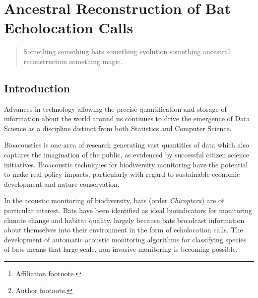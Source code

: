 \documentclass[wsdraft]{ws-rv9x6} %
\begin{document}
\chapter[Ancestral Reconstruction of Bat Echolocation Calls]{Ancestral Reconstruction of Bat Echolocation Calls}\label{ra_ch1}

\author[J.P. Meagher et al.]{J.P. Meagher\footnote{Author footnote.}}

\address{Department of Statistics,\\
University of Warwick, \\
J.Meagher@Warwick.ac.uk\footnote{Affiliation footnote.}}

\begin{abstract}
 Something something bats something evolution something ancestral reconstruction something magic.
\end{abstract}
\body

\section{Introduction}

Advances in technology allowing the precise quantification and storage of information about the world around us continues to drive the emergence of Data Science as a discipline distinct from both Statistics and Computer Science.

Bioacoustics is one area of research generating vast quantities of data which also captures the imagination of the public, as evidenced by successful citizen science initiatives. \cite{allen2006citizen} \cite{pettorelli2013indicator} Bioacoustic techniques for biodiversity monitoring \cite{stathopoulos2017bat} \cite{damoulas2010bayesian} have the potential to make real policy impacts, particularly with regard to sustainable economic development and nature conservation.

In the acoustic monitoring of biodiversity, bats (order \textit{Chiroptera}) are of particular interest. Bats have been identified as ideal bioindicators for monitoring climate change and habitat quality,\cite{jones2009carpe} largely because bats broadcast information about themselves into their environment in the form of echolocation calls.\cite{jones2005echolocation} The development of automatic acoustic monitoring algorithms for classifying species of bats \cite{stathopoulos2017bat} \cite{walters2012continental} means that large scale, non-invasive monitoring is becoming possible. 
\end{document}
